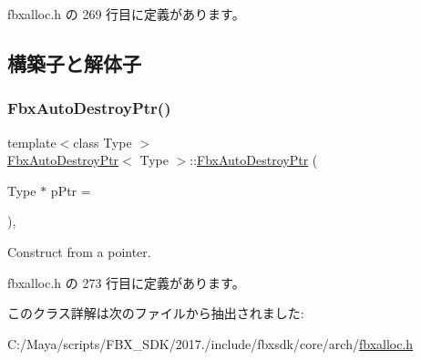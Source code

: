  fbxalloc.\+h の 269 行目に定義があります。



\subsection{構築子と解体子}
\mbox{\label{class_fbx_auto_destroy_ptr_a7bf34add17eaf53502e326e1e5b0c977}} 
\subsubsection{\texorpdfstring{Fbx\+Auto\+Destroy\+Ptr()}{FbxAutoDestroyPtr()}}
{\footnotesize\ttfamily template$<$class Type $>$ \\
\hyperlink{class_fbx_auto_destroy_ptr}{Fbx\+Auto\+Destroy\+Ptr}$<$ Type $>$\+::\hyperlink{class_fbx_auto_destroy_ptr}{Fbx\+Auto\+Destroy\+Ptr} (\begin{DoxyParamCaption}\item[{Type $\ast$}]{p\+Ptr = {} }\end{DoxyParamCaption})\hspace{0.3cm}{\ttfamily [inline]}, {\ttfamily [explicit]}}



Construct from a pointer. 



 fbxalloc.\+h の 273 行目に定義があります。



このクラス詳解は次のファイルから抽出されました\+:\begin{DoxyCompactItemize}
\item 
C\+:/\+Maya/scripts/\+F\+B\+X\+\_\+\+S\+D\+K/2017./include/fbxsdk/core/arch/\hyperlink{fbxalloc_8h}{fbxalloc.\+h}\end{DoxyCompactItemize}
